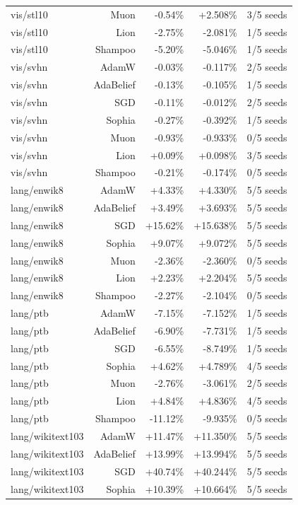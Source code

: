 \begin{table}[t]
\begin{tabular}{lrrrr}
vis/stl10 & Muon & -0.54\% & +2.508\% & 3/5 seeds \\
vis/stl10 & Lion & -2.75\% & -2.081\% & 1/5 seeds \\
vis/stl10 & Shampoo & -5.20\% & -5.046\% & 1/5 seeds \\
vis/svhn & AdamW & -0.03\% & -0.117\% & 2/5 seeds \\
vis/svhn & AdaBelief & -0.13\% & -0.105\% & 1/5 seeds \\
vis/svhn & SGD & -0.11\% & -0.012\% & 2/5 seeds \\
vis/svhn & Sophia & -0.27\% & -0.392\% & 1/5 seeds \\
vis/svhn & Muon & -0.93\% & -0.933\% & 0/5 seeds \\
vis/svhn & Lion & +0.09\% & +0.098\% & 3/5 seeds \\
vis/svhn & Shampoo & -0.21\% & -0.174\% & 0/5 seeds \\
lang/enwik8 & AdamW & +4.33\% & +4.330\% & 5/5 seeds \\
lang/enwik8 & AdaBelief & +3.49\% & +3.693\% & 5/5 seeds \\
lang/enwik8 & SGD & +15.62\% & +15.638\% & 5/5 seeds \\
lang/enwik8 & Sophia & +9.07\% & +9.072\% & 5/5 seeds \\
lang/enwik8 & Muon & -2.36\% & -2.360\% & 0/5 seeds \\
lang/enwik8 & Lion & +2.23\% & +2.204\% & 5/5 seeds \\
lang/enwik8 & Shampoo & -2.27\% & -2.104\% & 0/5 seeds \\
lang/ptb & AdamW & -7.15\% & -7.152\% & 1/5 seeds \\
lang/ptb & AdaBelief & -6.90\% & -7.731\% & 1/5 seeds \\
lang/ptb & SGD & -6.55\% & -8.749\% & 1/5 seeds \\
lang/ptb & Sophia & +4.62\% & +4.789\% & 4/5 seeds \\
lang/ptb & Muon & -2.76\% & -3.061\% & 2/5 seeds \\
lang/ptb & Lion & +4.84\% & +4.836\% & 4/5 seeds \\
lang/ptb & Shampoo & -11.12\% & -9.935\% & 0/5 seeds \\
lang/wikitext103 & AdamW & +11.47\% & +11.350\% & 5/5 seeds \\
lang/wikitext103 & AdaBelief & +13.99\% & +13.994\% & 5/5 seeds \\
lang/wikitext103 & SGD & +40.74\% & +40.244\% & 5/5 seeds \\
lang/wikitext103 & Sophia & +10.39\% & +10.664\% & 5/5 seeds \\

\end{tabular}
\end{table}
